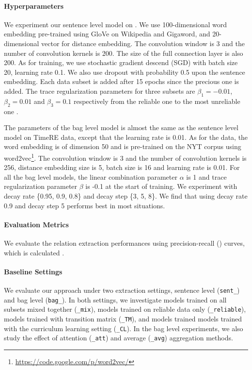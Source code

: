 \paragraph{Hyperparameters}  
We experiment our sentence level model on \TimeRE. We use 100-dimensional word embedding pre-trained using GloVe \cite{pennington2014glove} on Wikipedia and Gigaword, and 20-dimensional vector for distance embedding. The convolution window is 3 and the number of convolution kernels is 200. The size of the full connection layer is also 200. As for training, we use stochastic gradient descend (SGD) with batch size 20, learning rate 0.1. We also use dropout with probability 0.5 upon the sentence embedding. Each data subset is added after 15 epochs since the precious one is added. The trace regularization parameters for three subsets are $\beta_1=-0.01$, $\beta_2=0.01$ and $\beta_3=0.1$ respectively from the reliable one to the most unreliable one .


The parameters of the bag level model is almost the same as the sentence level model on TimeRE data, except that the learning rate is 0.01. As for the \EntityRE data, the word embedding is of dimension 50 and is pre-trained on the NYT corpus using word2vec\footnote{\url{ https://code.google.com/p/word2vec/}}. The convolution window is 3 and the number of convolution kernels is 256, distance embedding size is 5, batch size is 16 and learning rate is 0.01. For all the bag level models, the linear combination parameter $\alpha$ is 1 and trace regularization parameter $\beta$ is -0.1 at the start of training. We experiment with decay rate \{0.95, 0.9, 0.8\} and decay step \{3, 5, 8\}. We find that using decay rate 0.9 and decay step 5 performs best in most situations.

\paragraph{Evaluation Metrics}
We evaluate the relation extraction performances using precision-recall (\PR) curves, which is calculated .

\paragraph{Baseline Settings}
We evaluate our approach under two extraction settings, sentence level
(\texttt{sent\_}) and bag level (\texttt{bag\_}). In both settings, we
investigate models trained on all subsets mixed together (\texttt{\_mix}),
models trained on reliable data only (\texttt{\_reliable}), models trained
with transition matrix (\texttt{\_TM}), and models trained models trained
with the curriculum learning setting  (\texttt{\_CL}). In the bag level
experiments, we also study the effect of attention (\texttt{\_att}) and
average
(\texttt{\_avg}) aggregation methods.

